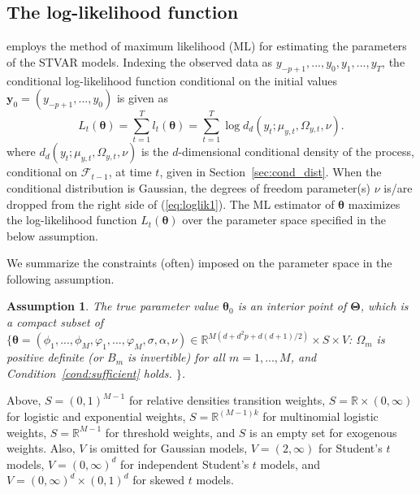 \documentclass[nojss]{jss}
\newtheorem{assumption}{Assumption}
\begin{document}
\subsection{The log-likelihood function}\label{sec:loglik}

 employs the method of maximum likelihood (ML) for estimating the parameters of the STVAR models. Indexing the observed data as $y_{-p+1},...,y_0,y_1,...,y_T$, the conditional log-likelihood function conditional on the initial values $\boldsymbol{y}_0=(y_{-p+1},...,y_0)$ is given as
\begin{equation}\label{eq:loglik1}
L_t(\boldsymbol{\theta})=\sum_{t=1}^T l_t(\boldsymbol{\theta}) = \sum_{t=1}^T \log d_d(y_t;\mu_{y,t},\Omega_{y,t},\nu).
\end{equation}
where $d_d(y_t;\mu_{y,t},\Omega_{y,t},\nu)$ is the $d$-dimensional conditional density of the process, conditional on $\mathcal{F}_{t-1}$, at time $t$, given in Section~\ref{sec:cond_dist}. When the conditional distribution is Gaussian, the degrees of freedom parameter(s) $\nu$ is/are dropped from the right side of (\ref{eq:loglik1}). The ML estimator of $\boldsymbol{\theta}$ maximizes the log-likelihood function $L_t(\boldsymbol{\theta})$ over the parameter space specified in the below assumption.

We summarize the constraints (often) imposed on the parameter space in the following assumption.
%
\begin{assumption}\label{as:mle}
The true parameter value $\boldsymbol{\theta}_0$ is an interior point of $\boldsymbol{\Theta}$, which is a compact subset of
$\lbrace \boldsymbol{\theta}=(\phi_{1},...,\phi_M,\varphi_1,...,\varphi_M,\sigma,\alpha,\nu)\in\mathbb{R}^{M(d + d^2p + d(d+1)/2)}\times S\times V$: $\Omega_m$ is positive definite (or $B_m$ is invertible) for all $m=1,...,M$, and Condition~\ref{cond:sufficient} holds.
$\rbrace$.
\end{assumption}
%
Above, $S=(0,1)^{M-1}$ for relative densities transition weights, $S=\mathbb{R}\times (0,\infty)$ for logistic and exponential weights, $S=\mathbb{R}^{(M-1)k}$ for multinomial logistic weights, $S=\mathbb{R}^{M-1}$ for threshold weights, and $S$ is an empty set for exogenous weights. Also, $V$ is omitted for Gaussian models, $V=(2, \infty)$ for Student's $t$ models, $V=(0, \infty)^d$ for independent Student's $t$ models, and $V=(0, \infty)^d\times (0,1)^d$ for skewed $t$ models.
\end{document}
